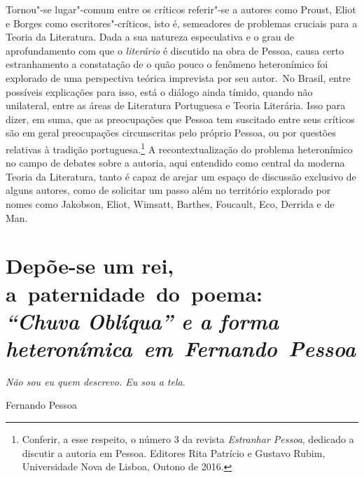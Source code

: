 Tornou"-se lugar"-comum entre os críticos referir"-se a autores como
Proust, Eliot e Borges como escritores"-críticos, isto é, semeadores de problemas cruciais para a Teoria da Literatura. Dada a sua natureza
especulativa e o grau de aprofundamento com que o \emph{literário} é
discutido na obra de Pessoa, causa certo estranhamento a constatação de
o quão pouco o fenômeno heteronímico foi explorado de uma perspectiva
teórica imprevista por seu autor.~No Brasil, entre possíveis explicações
para isso, está o diálogo ainda tímido, quando não unilateral, entre as
áreas de Literatura Portuguesa e Teoria Literária. Isso para dizer, em
suma, que as preocupações que Pessoa tem suscitado entre seus críticos
são em geral preocupações circunscritas pelo próprio Pessoa, ou por
questões relativas à tradição portuguesa.\footnote{Conferir, a esse
  respeito, o número 3 da revista \emph{Estranhar Pessoa}, dedicado a
  discutir a autoria em Pessoa. Editores Rita Patrício e Gustavo Rubim,
  Universidade Nova de Lisboa, Outono de 2016.} A recontextualização do
problema heteronímico no campo de debates sobre a autoria, aqui
entendido como central da moderna Teoria da Literatura, tanto é capaz de
arejar um espaço de discussão exclusivo de alguns autores, como de
solicitar um passo além no território explorado por nomes como Jakobson,
Eliot, Wimsatt, Barthes, Foucault, Eco, Derrida e de Man.

\chapter*{Depõe-se um rei, a~paternidade~do~poema:\\ \emph{\large``Chuva Oblíqua'' e a forma heteronímica~em~Fernando~Pessoa}}


\begin{flushright}
{\footnotesize
\parbox{160pt}{\emph{Não sou eu quem descrevo. Eu sou a tela}.}

\parbox{70pt}{Fernando Pessoa}
}
\end{flushright}

